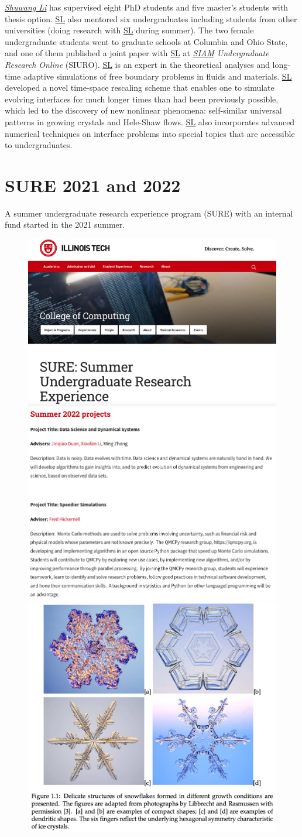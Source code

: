 \documentclass[11pt]{NSFamsart}
\newcommand{\SL}{\hyperlink{SLlink}{SL}\xspace}
\newcommand{\SIAM}{\hyperlink{SIAMlink}{SIAM}\xspace}
\begin{document}
\noindent \underline{\textit{Shuwang Li}} has supervised eight PhD students and five master's students with thesis option. \SL also mentored six undergraduates including students from other universities (doing research with \SL during summer). The two female undergraduate students went to graduate schools at Columbia and Ohio State,  and one of them published a joint paper with \SL at {\it \SIAM Undergraduate Research Online} (SIURO). 
\SL is an expert in the theoretical analyses and
long-time adaptive simulations of free boundary problems in  fluids and
materials. \SL developed a novel time-space
rescaling scheme that enables one to simulate evolving interfaces for much
longer times than had been previously possible, which led to the discovery of new nonlinear
phenomena: self-similar universal patterns in growing crystals and Hele-Shaw  flows. \SL also incorporates advanced numerical techniques on interface problems into special topics that are accessible to undergraduates. 

 


\section{SURE 2021 and 2022}
\label{sec:SURE}
A summer undergraduate research experience program (SURE) with an internal fund started in the 2021 summer. 
\begin{figure}[h]
    \centering
    \includegraphics[width=0.35\linewidth]{SUREWebsite.png}
    \includegraphics[width=0.3\linewidth]{SUREProgram.png}
    \includegraphics[width=0.25\linewidth]{IceCrystal.png}
    \label{fig:SUREWebsite}
\end{figure}
\end{document}
